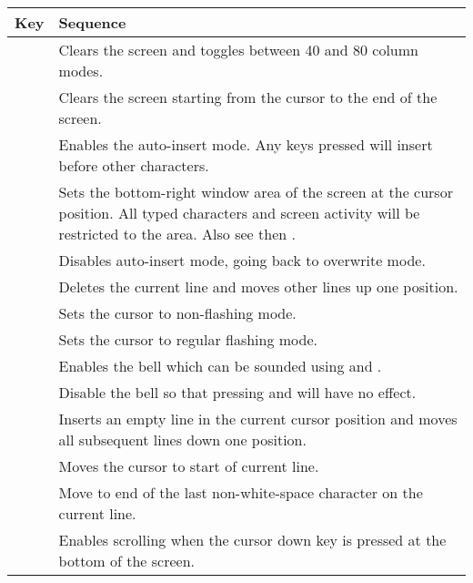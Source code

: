 \begin{center}
\begin{longtable}{C{2cm}|L{5.5cm}}
	\textbf{Key} & \textbf{Sequence}\\
   \hline
	\endhead

 &
Clears the screen and toggles between 40 and 80 column modes.\\

 &
Clears the screen starting from the cursor to the end of the screen.\\

 &
Enables the auto-insert mode. Any keys pressed will insert before other characters.\\

 &
Sets the bottom-right window area of the screen at the cursor position. All typed characters and screen activity will be restricted to the area. Also see  then .\\

 &
Disables auto-insert mode, going back to overwrite mode.\\

 &
Deletes the current line and moves other lines up one position.\\

 &
Sets the cursor to non-flashing mode.\\

 &
Sets the cursor to regular flashing mode.\\

 &
Enables the bell which can be sounded using  and .\\

 &
Disable the bell so that pressing  and  will have no effect.\\

 &
Inserts an empty line in the current cursor position and moves all subsequent lines down one position.\\

 &
Moves the cursor to start of current line.\\

 &
Move to end of the last non-white-space character on the current line.\\

 &
Enables scrolling when the cursor down key is pressed at the bottom of the screen.\\


\end{longtable}
\end{center}
